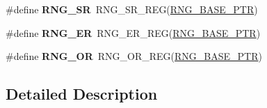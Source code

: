\begin{DoxyCompactItemize}
\item 
\hypertarget{group___r_n_g___register___accessor___macros_ga0c576b22e5f9deb46a5200be5eb9d456}{}\#define {\bfseries R\+N\+G\+\_\+\+S\+R}~R\+N\+G\+\_\+\+S\+R\+\_\+\+R\+E\+G(\hyperlink{group___r_n_g___peripheral_ga799f35e89514a95969257046b5dab042}{R\+N\+G\+\_\+\+B\+A\+S\+E\+\_\+\+P\+T\+R})\label{group___r_n_g___register___accessor___macros_ga0c576b22e5f9deb46a5200be5eb9d456}

\item 
\hypertarget{group___r_n_g___register___accessor___macros_ga03d0c14362b0b67b1aaa8ac81f5d74c1}{}\#define {\bfseries R\+N\+G\+\_\+\+E\+R}~R\+N\+G\+\_\+\+E\+R\+\_\+\+R\+E\+G(\hyperlink{group___r_n_g___peripheral_ga799f35e89514a95969257046b5dab042}{R\+N\+G\+\_\+\+B\+A\+S\+E\+\_\+\+P\+T\+R})\label{group___r_n_g___register___accessor___macros_ga03d0c14362b0b67b1aaa8ac81f5d74c1}

\item 
\hypertarget{group___r_n_g___register___accessor___macros_ga0cd00a8427bccb9647b6b2691986bb7a}{}\#define {\bfseries R\+N\+G\+\_\+\+O\+R}~R\+N\+G\+\_\+\+O\+R\+\_\+\+R\+E\+G(\hyperlink{group___r_n_g___peripheral_ga799f35e89514a95969257046b5dab042}{R\+N\+G\+\_\+\+B\+A\+S\+E\+\_\+\+P\+T\+R})\label{group___r_n_g___register___accessor___macros_ga0cd00a8427bccb9647b6b2691986bb7a}

\end{DoxyCompactItemize}


\subsection{Detailed Description}
